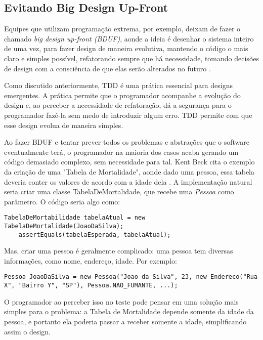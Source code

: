 \subsection{Evitando Big Design Up-Front}

Equipes que utilizam programação extrema, por exemplo, 
deixam de fazer o chamado \textit{big design up-front (BDUF)}, aonde a ideia é desenhar o sistema inteiro de uma vez, para fazer design de maneira evolutiva,
mantendo o código o mais claro e simples possível, refatorando sempre que há necessidade, tomando decisões de design com a consciência de que elas
serão alterados no futuro \cite{is-design-dead}.

Como discutido anteriormente, TDD é uma prática essencial para designs emergentes. A prática permite que o programador acompanhe a 
evolução do design e, ao perceber a necessidade de refatoração, dá a segurança para o programador fazê-la sem medo de introduzir algum erro. 
TDD permite com que esse design evolua de maneira simples. 

Ao fazer BDUF e tentar prever todos os problemas e abstrações que o software eventualmente terá, o programador na maioria dos casos
acaba gerando um código demasiado complexo, sem necessidade para tal. Kent Beck cita o exemplo da criação de uma "Tabela de Mortalidade",
aonde dado uma pessoa, essa tabela deveria conter os valores de acordo com a idade dela \cite{aim-fire}. A implementação natural
seria criar uma classe TabelaDeMortalidade, que recebe uma \textit{Pessoa} como parâmetro. O código seria algo como:

\begin{lstlisting}[frame=trbl]
	TabelaDeMortabilidade tabelaAtual = new TabelaDeMortalidade(JoaoDaSilva);
	assertEquals(tabelaEsperada, tabelaAtual);
\end{lstlisting}

Mas, criar uma pessoa é geralmente complicado: uma pessoa tem diversas informações, como nome, endereço, idade. Por exemplo:

\begin{lstlisting}[frame=trbl]
	Pessoa JoaoDaSilva = new Pessoa("Joao da Silva", 23, new Endereco("Rua X", "Bairro Y", "SP"), Pessoa.NAO_FUMANTE, ...);
\end{lstlisting}

O programador ao perceber isso no teste pode pensar em uma solução mais simples para o problema: a Tabela de Mortalidade depende
somente da idade da pessoa, e portanto ela poderia passar a receber somente a idade, simplificando assim o design.

